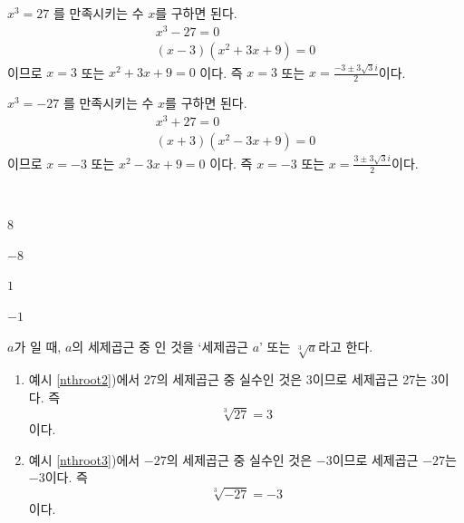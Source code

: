 \documentclass{oblivoir}
\begin{document}
%
\label{nthroot2}
\vspace{-10pt}
\begin{mdframed}
\(x^3=27\)
를 만족시키는 수 \(x\)를 구하면 된다.
\begin{gather*}
x^3-27			=0\\
(x-3)(x^2+3x+9)	=0
\end{gather*}
이므로 \(x=3\) 또는 \(x^2+3x+9=0\) 이다.
즉
\(x=3\) 또는 \(x=\frac{-3\pm3\sqrt3i}2\)이다.
\end{mdframed}

%
\label{nthroot3}
\vspace{-10pt}
\begin{mdframed}
\(x^3=-27\)
를 만족시키는 수 \(x\)를 구하면 된다.
\begin{gather*}
x^3+27			=0\\
(x+3)(x^2-3x+9)	=0
\end{gather*}
이므로 \(x=-3\) 또는 \(x^2-3x+9=0\) 이다.
즉
\(x=-3\) 또는 \(x=\frac{3\pm3\sqrt3i}2\)이다.
\end{mdframed}

%
\label{nthroot4}
\\
\begin{enumerate*}[itemjoin=\hspace{0.2\textwidth}]
\item
8
\item
\(-8\)
\item
\(1\)
\item
\(-1\)
\end{enumerate*}

\newpage
%
\begin{mdframed}
\label{nthroot5}
\(a\)가 일 때, \(a\)의 세제곱근 중 인 것을 `세제곱근 \(a\)' 또는 \(\sqrt[3]a\)라고 한다.
\end{mdframed}

%
\exam{}
\begin{enumerate}\label{nthroot6}
\item
예시 \ref{nthroot2})에서 27의 세제곱근 중 실수인 것은 \(3\)이므로 세제곱근 27는 3이다.
즉
\[\sqrt[3]{27}=3\]
이다.
\item
예시 \ref{nthroot3})에서 \(-27\)의 세제곱근 중 실수인 것은 \(-3\)이므로 세제곱근 \(-27\)는 \(-3\)이다.
즉
\[\sqrt[3]{-27}=-3\]
이다.
\end{enumerate}
\end{document}
